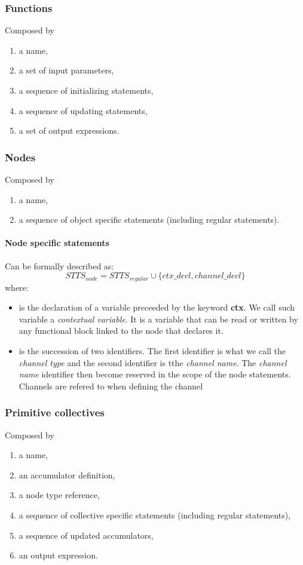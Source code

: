 \documentclass{article}
\begin{document}
\subsubsection{Functions}
Composed by 
\begin{enumerate}
    \item a name,
    \item a set of input parameters,
    \item a sequence of initializing statements,
    \item a sequence of updating statements,
    \item a set of output expressions.
\end{enumerate}



\subsubsection{Nodes}
Composed by 
\begin{enumerate}
    \item a name,
    \item a sequence of object specific statements (including regular statements).
\end{enumerate}

\paragraph{Node specific statements}
Can be formally described as:
\[
STTS_{node} = STTS_{regular} \cup \{ctx\_decl, channel\_decl\}
\]
where:
\begin{itemize}
    \item[$ctx\_decl$] is the declaration of a variable preceeded by the keyword \textbf{ctx}. We call such variable a \emph{contextual variable}. It is a variable that can be read or written by any functional block linked to the node that declares it.
    \item[$channel\_decl$] is the succession of two identifiers. The first identifier is what we call the \emph{channel type} and the second identifier is tthe \emph{channel name}. The \emph{channel name} identifier then become reserved in the scope of the node statements. Channels are refered to when defining the channel 
\end{itemize}

\subsubsection{Primitive collectives}
Composed by 
\begin{enumerate}
    \item a name,
    \item an accumulator definition,
    \item a node type reference,
    \item a sequence of collective specific statements (including regular statements),
    \item a sequence of updated accumulators,
    \item an output expression.
\end{enumerate}
\end{document}
